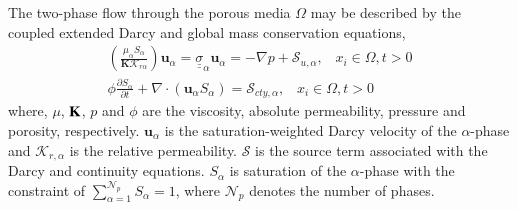 \documentclass[preprint,authoryear,12pt]{elsarticle}
\begin{document}
\medskip
The two-phase flow through the porous media $\Omega$ may be described by the coupled extended Darcy and global mass conservation equations,
\begin{eqnarray}
\left(\displaystyle\frac{\mu_{\alpha}S_{\alpha}}{{\mathbf K}\mathcal{K}_{r\alpha}}\right) {\mathbf u}_{\alpha} = \underline{\underline{\sigma}}_{\alpha} {\mathbf u}_{\alpha} = -\nabla p + \mathcal{S}_{u,\alpha},\;\;\; x_{i}\in\Omega, t>0 \label{eqn:darcy_eqn} \\
\phi\displaystyle\frac{\partial S_{\alpha} }{\partial t} +   \nabla \cdot \left( {\mathbf u}_{\alpha}  S_{\alpha}\right) =  \mathcal{S}_{cty,\alpha},\;\;\; x_{i}\in\Omega, t>0\label{eqn:saturation_eqn}
\end{eqnarray}
where, $\mu$, ${\bf K}$, $p$ and $\phi$ are the viscosity, absolute permeability, pressure and porosity, respectively. ${\mathbf u}_{\alpha}$ is the saturation-weighted Darcy velocity of the $\alpha$-phase and $\mathcal{K}_{r,\alpha}$ is the relative permeability. $\mathcal{S}$ is the source term associated with the Darcy and continuity equations. $S_{\alpha}$ is saturation of the $\alpha$-phase with the constraint of $\sum\limits_{\alpha=1}^{\mathcal{N}_{p}} S_{\alpha} = 1$, where $\mathcal{N}_{p}$ denotes the number of phases.

\end{document}
